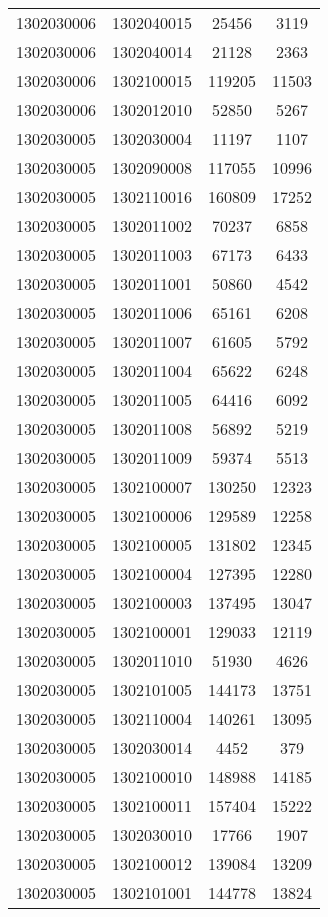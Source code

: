 \begin{longtable}[h]{llcc}
		1302030006 & 1302040015 & 25456 & 3119\\
		1302030006 & 1302040014 & 21128 & 2363\\
		1302030006 & 1302100015 & 119205 & 11503\\
		1302030006 & 1302012010 & 52850 & 5267\\
		1302030005 & 1302030004 & 11197 & 1107\\
		1302030005 & 1302090008 & 117055 & 10996\\
		1302030005 & 1302110016 & 160809 & 17252\\
		1302030005 & 1302011002 & 70237 & 6858\\
		1302030005 & 1302011003 & 67173 & 6433\\
		1302030005 & 1302011001 & 50860 & 4542\\
		1302030005 & 1302011006 & 65161 & 6208\\
		1302030005 & 1302011007 & 61605 & 5792\\
		1302030005 & 1302011004 & 65622 & 6248\\
		1302030005 & 1302011005 & 64416 & 6092\\
		1302030005 & 1302011008 & 56892 & 5219\\
		1302030005 & 1302011009 & 59374 & 5513\\
		1302030005 & 1302100007 & 130250 & 12323\\
		1302030005 & 1302100006 & 129589 & 12258\\
		1302030005 & 1302100005 & 131802 & 12345\\
		1302030005 & 1302100004 & 127395 & 12280\\
		1302030005 & 1302100003 & 137495 & 13047\\
		1302030005 & 1302100001 & 129033 & 12119\\
		1302030005 & 1302011010 & 51930 & 4626\\
		1302030005 & 1302101005 & 144173 & 13751\\
		1302030005 & 1302110004 & 140261 & 13095\\
		1302030005 & 1302030014 & 4452 & 379\\
		1302030005 & 1302100010 & 148988 & 14185\\
		1302030005 & 1302100011 & 157404 & 15222\\
		1302030005 & 1302030010 & 17766 & 1907\\
		1302030005 & 1302100012 & 139084 & 13209\\
		1302030005 & 1302101001 & 144778 & 13824\\

\end{longtable}
